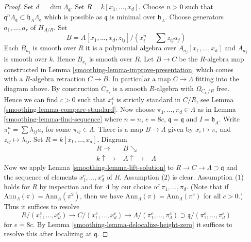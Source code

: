 \begin{proof}

Set $d = \dim \Lambda_\mathfrak q$. Set $R = k[x_1, \ldots, x_d]$.
Choose $n > 0$ such that
$\mathfrak q^n\Lambda_\mathfrak q \subset \mathfrak h_A\Lambda_\mathfrak q$
which is possible as $\mathfrak q$ is minimal over $\mathfrak h_A$.
Choose generators $a_1, \ldots, a_r$ of $H_{A/R}$. Set
$$
B = A[x_1, \ldots, x_d, z_{ij}]/(x_i^n - \sum z_{ij}a_j)
$$
Each $B_{a_j}$ is smooth over $R$ it is a polynomial
algebra over $A_{a_j}[x_1, \ldots, x_d]$ and $A_{a_j}$ is smooth over $k$.
Hence $B_{x_i}$ is smooth over $R$. Let $B \to C$ be the $R$-algebra
map constructed in Lemma \ref{smoothing-lemma-improve-presentation}
which comes with a $R$-algebra retraction $C \to B$. In particular
a map $C \to \Lambda$ fitting into the diagram above.
By construction $C_{x_i}$ is a smooth $R$-algebra with
$\Omega_{C_{x_i}/R}$ free. Hence we can find $c > 0$
such that $x_i^c$ is strictly standard in $C/R$, see
Lemma \ref{smoothing-lemma-compare-standard}.
Now choose $\pi_1, \ldots, \pi_d \in \Lambda$ as in
Lemma \ref{smoothing-lemma-find-sequence}
where $n = n$, $e = 8c$, $\mathfrak q = \mathfrak q$ and $I = \mathfrak h_A$.
Write $\pi_i^n = \sum \lambda_{ij} a_j$ for some $\pi_{ij} \in \Lambda$.
There is a map $B \to \Lambda$ given by $x_i \mapsto \pi_i$
and $z_{ij} \mapsto \lambda_{ij}$. Set $R = k[x_1, \ldots, x_d]$.
Diagram
$$
\begin{array}{ccc}R \longrightarrow & B \searrow &  \\ k \uparrow\longrightarrow & A \uparrow\longrightarrow & \Lambda\end{array}
$$
Now we apply
Lemma \ref{smoothing-lemma-lift-solution}
to $R \to C \to \Lambda \supset \mathfrak q$
and the sequence of elements $x_1^c, \ldots, x_d^c$ of $R$.
Assumption (2) is clear. Assumption (1) holds for $R$
by inspection and for $\Lambda$ by our choice of
$\pi_1, \ldots, \pi_d$. (Note that if
$\text{Ann}_\Lambda(\pi) = \text{Ann}_\Lambda(\pi^2)$, then we have
$\text{Ann}_\Lambda(\pi) = \text{Ann}_\Lambda(\pi^c)$ for all $c > 0$.)
Thus it suffices to resolve
$$
R/(x_1^e, \ldots, x_d^e) \to C/(x_1^e, \ldots, x_d^e) \to
\Lambda/(\pi_1^e, \ldots, \pi_d^e) \supset
\mathfrak q/(\pi_1^e, \ldots, \pi_d^e)
$$
for $e = 8c$. By
Lemma \ref{smoothing-lemma-delocalize-height-zero}
it suffices to resolve this after localizing at $\mathfrak q$.

\end{proof}
